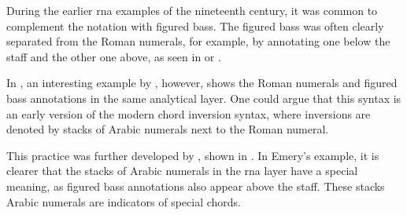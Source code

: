 
During the earlier \gls{rna} examples of the nineteenth
century, it was common to complement the notation with
figured bass. The figured bass was often clearly separated
from the Roman numerals, for example, by annotating one
below the staff and the other one above, as seen in
 or
.

In , an
interesting example by \textcite{bussler1878praktische},
however, shows the Roman numerals and figured bass
annotations in the same analytical layer. One could argue
that this syntax is an early version of the modern chord
inversion syntax, where inversions are denoted by stacks of
Arabic numerals next to the Roman numeral.


This practice was further developed by
\textcite{emery1879elements}, shown in
. In Emery's
example, it is clearer that the stacks of Arabic numerals in
the \gls{rna} layer have a special meaning, as figured bass
annotations also appear above the staff. These stacks Arabic
numerals are indicators of special chords.

